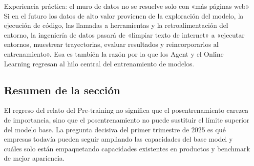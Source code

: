 \begin{importantbox}{Experiencia práctica: el muro de datos no se resuelve solo con «más páginas web»}
Si en el futuro los datos de alto valor provienen de la exploración del modelo, la ejecución de código, las llamadas a herramientas y la retroalimentación del entorno, la ingeniería de datos pasará de «limpiar texto de internet» a «ejecutar entornos, muestrear trayectorias, evaluar resultados y reincorporarlos al entrenamiento». Esa es también la razón por la que los Agent y el Online Learning regresan al hilo central del entrenamiento de modelos.
\end{importantbox}

\subsection{Resumen de la sección}

El regreso del relato del Pre-training no significa que el posentrenamiento carezca de importancia, sino que el posentrenamiento no puede sustituir el límite superior del modelo base. La pregunta decisiva del primer trimestre de 2025 es qué empresas todavía pueden seguir ampliando las capacidades del base model y cuáles solo están empaquetando capacidades existentes en productos y benchmark de mejor apariencia.
